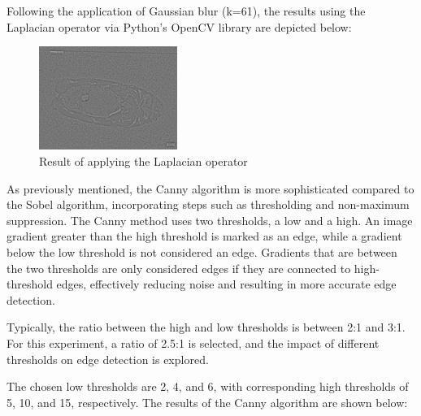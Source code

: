 Following the application of Gaussian blur (k=61), the results using the Laplacian operator via Python's OpenCV library are depicted below:

\begin{figure}[H]
\centering
\includegraphics[width=0.4\textwidth]{./fig/gausssian/laplacian61.jpg}
\caption{Result of applying the Laplacian operator}
\label{fig:laplacian}
\end{figure}

As previously mentioned, the Canny algorithm is more sophisticated compared to the Sobel algorithm, incorporating steps such as thresholding and non-maximum suppression. The Canny method uses two thresholds, a low and a high. An image gradient greater than the high threshold is marked as an edge, while a gradient below the low threshold is not considered an edge. Gradients that are between the two thresholds are only considered edges if they are connected to high-threshold edges, effectively reducing noise and resulting in more accurate edge detection.

Typically, the ratio between the high and low thresholds is between 2:1 and 3:1. For this experiment, a ratio of 2.5:1 is selected, and the impact of different thresholds on edge detection is explored.

The chosen low thresholds are 2, 4, and 6, with corresponding high thresholds of 5, 10, and 15, respectively. The results of the Canny algorithm are shown below:

